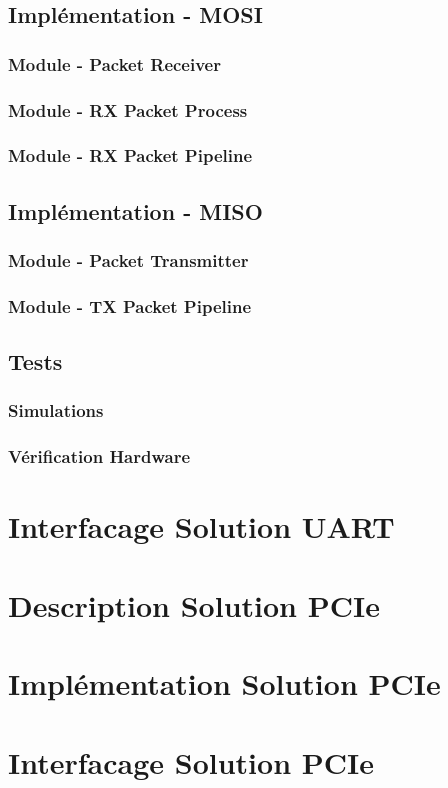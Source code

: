 \subsection{Implémentation - MOSI}
\subsubsection{Module - Packet Receiver}
\subsubsection{Module - RX Packet Process}
\subsubsection{Module - RX Packet Pipeline}

\subsection{Implémentation - MISO}
\subsubsection{Module - Packet Transmitter}
\subsubsection{Module - TX Packet Pipeline}

\subsection{Tests}
\subsubsection{Simulations}
\subsubsection{Vérification Hardware}

\section{Interfacage Solution UART}

\newpage

\section{Description Solution PCIe}
\section{Implémentation Solution PCIe}
\section{Interfacage Solution PCIe}
